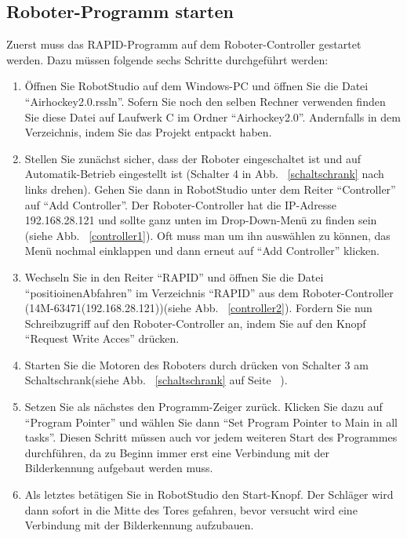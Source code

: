 \subsection{Roboter-Programm starten} 
Zuerst muss das RAPID-Programm auf dem Roboter-Controller gestartet werden. Dazu müssen folgende sechs Schritte durchgeführt werden:  
\begin{enumerate}
\item Öffnen Sie RobotStudio auf dem Windows-PC und öffnen Sie die Datei \enquote{Airhockey2.0.rssln}. Sofern Sie noch den selben Rechner verwenden finden Sie diese Datei auf Laufwerk C im Ordner \enquote{Airhockey2.0}. Andernfalls in dem Verzeichnis, indem Sie das Projekt entpackt haben. 

\item Stellen Sie zunächst sicher, dass der Roboter eingeschaltet ist und auf Automatik-Betrieb eingestellt ist (Schalter 4 in Abb. ~\ref{schaltschrank} nach links drehen). Gehen Sie dann in RobotStudio unter dem Reiter \enquote{Controller} auf \enquote{Add Controller}. Der Roboter-Controller hat die IP-Adresse 192.168.28.121 und sollte ganz unten im Drop-Down-Menü zu finden sein (siehe Abb. ~\ref{controller1}). Oft muss man um ihn auswählen zu können, das Menü nochmal einklappen und dann erneut auf \enquote{Add Controller} klicken.

\item Wechseln Sie in den Reiter \enquote{RAPID} und öffnen Sie die Datei \enquote{positioinenAbfahren} im Verzeichnis \enquote{RAPID} aus dem Roboter-Controller (14M-63471(192.168.28.121))(siehe Abb. ~\ref{controller2}). Fordern Sie nun Schreibzugriff auf den Roboter-Controller an, indem Sie auf den Knopf \enquote{Request Write Acces} drücken. 

\item Starten Sie die Motoren des Roboters durch drücken von Schalter 3 am Schaltschrank(siehe Abb. ~\ref{schaltschrank} auf Seite ~\pageref{schaltschrank}).

\item Setzen Sie als nächstes den Programm-Zeiger zurück. Klicken Sie dazu auf \enquote{Program Pointer} und wählen Sie dann \enquote{Set Program Pointer to Main in all tasks}. Diesen Schritt müssen auch vor jedem weiteren Start des Programmes durchführen, da zu Beginn immer erst eine Verbindung mit der Bilderkennung aufgebaut werden muss.

\item Als letztes betätigen Sie in RobotStudio den Start-Knopf. Der Schläger wird dann sofort in die Mitte des Tores gefahren, bevor versucht wird eine Verbindung mit der Bilderkennung aufzubauen.    
\end{enumerate}

